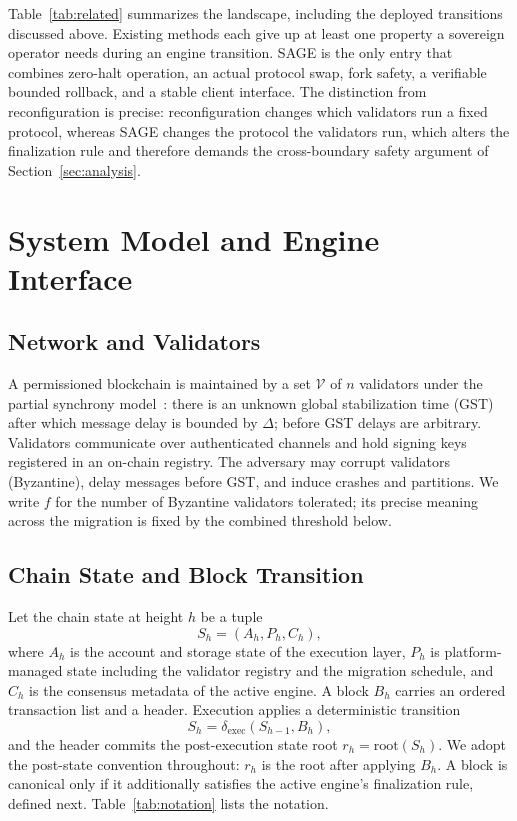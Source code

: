 \documentclass[journal]{IEEEtran}
\begin{document}
Table~\ref{tab:related} summarizes the landscape, including the deployed transitions
discussed above. Existing methods each give up at least one property a sovereign operator
needs during an engine transition. SAGE is the only entry that combines zero-halt operation,
an actual protocol swap, fork safety, a verifiable bounded rollback, and a stable client
interface. The distinction from reconfiguration is precise: reconfiguration changes which
validators run a fixed protocol, whereas SAGE changes the protocol the validators run, which
alters the finalization rule and therefore demands the cross-boundary safety argument of
Section~\ref{sec:analysis}.

\section{System Model and Engine Interface}
\label{sec:model}

\subsection{Network and Validators}
A permissioned blockchain is maintained by a set $\mathcal{V}$ of $n$ validators under the
partial synchrony model~\cite{dls}: there is an unknown global stabilization time (GST) after
which message delay is bounded by $\Delta$; before GST delays are arbitrary. Validators
communicate over authenticated channels and hold signing keys registered in an on-chain
registry. The adversary may corrupt validators (Byzantine), delay messages before GST, and
induce crashes and partitions. We write $f$ for the number of Byzantine validators tolerated;
its precise meaning across the migration is fixed by the combined threshold below.

\subsection{Chain State and Block Transition}
Let the chain state at height $h$ be a tuple
\begin{equation}
S_h = (A_h, P_h, C_h),
\end{equation}
where $A_h$ is the account and storage state of the execution layer, $P_h$ is
platform-managed state including the validator registry and the migration schedule, and
$C_h$ is the consensus metadata of the active engine. A block $B_h$ carries an ordered
transaction list and a header. Execution applies a deterministic transition
\begin{equation}
S_{h} = \delta_{\mathrm{exec}}(S_{h-1}, B_h),
\end{equation}
and the header commits the post-execution state root $r_h = \mathrm{root}(S_h)$. We adopt the
post-state convention throughout: $r_h$ is the root after applying $B_h$. A block is
canonical only if it additionally satisfies the active engine's finalization rule, defined
next. Table~\ref{tab:notation} lists the notation.
\end{document}
